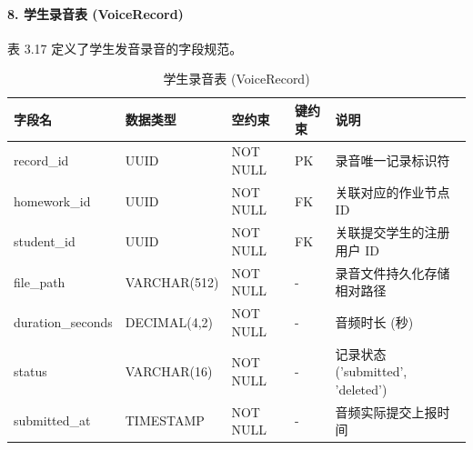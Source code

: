 \paragraph{8. 学生录音表 (VoiceRecord)}
表 3.17 定义了学生发音录音的字段规范。
\begin{table}[H]
\centering
\caption{学生录音表 (VoiceRecord)}
\begin{tabularx}{\textwidth}{l p{3.2cm} p{1.8cm} p{1.8cm} X}
\toprule
\textbf{字段名} & \textbf{数据类型} & \textbf{空约束} & \textbf{键约束} & \textbf{说明} \\
\midrule
record\_id & UUID & NOT NULL & PK & 录音唯一记录标识符 \\
homework\_id & UUID & NOT NULL & FK & 关联对应的作业节点 ID \\
student\_id & UUID & NOT NULL & FK & 关联提交学生的注册用户 ID \\
file\_path & VARCHAR(512) & NOT NULL & - & 录音文件持久化存储相对路径 \\
duration\_seconds & DECIMAL(4,2) & NOT NULL & - & 音频时长 (秒) \\
status & VARCHAR(16) & NOT NULL & - & 记录状态 ('submitted', 'deleted') \\
submitted\_at & TIMESTAMP & NOT NULL & - & 音频实际提交上报时间 \\
\bottomrule
\end{tabularx}
\end{table}
